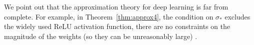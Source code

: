 We point out that the approximation theory for deep learning is far from complete.
For example, in Theorem~\ref{thm:approx4}, the condition on $\sigma_*$ excludes the widely used ReLU activation function, there are no constraints on the magnitude of the weights (so they can be unreasonably large)%
.

